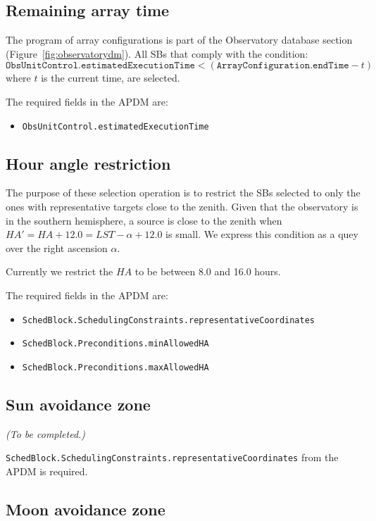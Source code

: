 \documentclass{article}
\begin{document}
\subsection{Remaining array time}

The program of array configurations is part of the Observatory database
section (Figure~\ref{fig:observatorydm}). All SBs that comply with the condition:
$$
\mathtt{ObsUnitControl.estimatedExecutionTime} < (\mathtt{ArrayConfiguration.endTime} - t)
$$
where $t$ is the current time, are selected.

The required fields in the APDM are:
\begin{itemize}
\item {\tt ObsUnitControl.estimatedExecutionTime}
\end{itemize}

\subsection{Hour angle restriction}

The purpose of these selection operation is to restrict the SBs selected to
only the ones with representative targets close to the zenith. Given that the observatory
is in the southern hemisphere, a source is close to the zenith when $HA' = HA + 12.0 = LST - \alpha + 12.0$
is small. We express this condition as a quey over the right ascension $\alpha$.

Currently we restrict the $HA$ to be between 8.0 and 16.0 hours.

The required fields in the APDM are:
\begin{itemize}
\item {\tt SchedBlock.SchedulingConstraints.representativeCoordinates}
\item {\tt SchedBlock.Preconditions.minAllowedHA}
\item {\tt SchedBlock.Preconditions.maxAllowedHA}
\end{itemize}

\subsection{Sun avoidance zone}

{\em (To be completed.)}

{\tt SchedBlock.SchedulingConstraints.representativeCoordinates} from the APDM is required.

\subsection{Moon avoidance zone}
\end{document}
